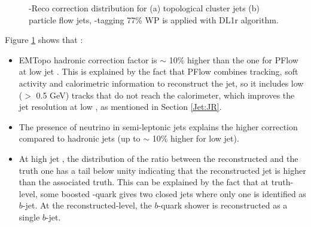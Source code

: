 \begin{figure}[htbp]
   \centering
   \quad
   \begin{tcolorbox}[colback=black!5!white,colframe=white!75!black]
   \caption{\pT-Reco correction distribution for (a) topological cluster jets (b) particle flow jets, \bq-tagging 77\% WP is applied with DL1r algorithm.}
   \label{fig:Jet:Cal:BCal:pTReco}
   \end{tcolorbox}
   
\end{figure}
Figure \ref{fig:Jet:Cal:BCal:pTReco} shows that :
\begin{itemize}
    \item EMTopo hadronic correction factor is $\sim$ 10\% higher than the one for PFlow at low jet \pT. This is explained by the fact that PFlow combines tracking, soft activity and calorimetric information to reconstruct the jet, so it includes low \pT (\pT $>$ 0.5 GeV) tracks that do not reach the calorimeter, which improves the jet resolution at low \pT, as mentioned in Section \ref{Jet:JR}. 
    \item The presence of neutrino in semi-leptonic jets explains the higher correction compared to hadronic jets (up to $\sim$ 10\% higher for low \pT jet).
    \item At high jet \pT, the distribution of the ratio between the reconstructed \pT and the truth one has a tail below unity indicating that the reconstructed jet \pT is higher than the associated truth. This can be explained by the fact that at truth-level, some boosted \bq-quark gives two closed jets where only one is identified as $b$-jet. At the reconstructed-level, the $b$-quark shower is reconstructed as a single $b$-jet.
\end{itemize}

